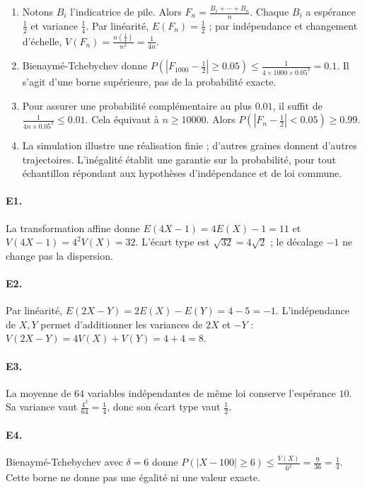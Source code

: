 \begin{enumerate}
\item Notons $B_i$ l'indicatrice de pile. Alors $F_n=\frac{B_1+\cdots+B_n}{n}$. Chaque $B_i$ a espérance $\frac{1}{2}$ et variance $\frac{1}{4}$. Par linéarité, $E(F_n)=\frac{1}{2}$ ; par indépendance et changement d'échelle, $V(F_n)=\frac{n(\frac{1}{4})}{n^2}=\frac{1}{4n}$.
\item Bienaymé-Tchebychev donne $P(|F_{1000}-\frac{1}{2}|\ge\num{0,05})\le\frac{1}{4\times1000\times\num{0,05}^2}=\num{0,1}$. Il s'agit d'une borne supérieure, pas de la probabilité exacte.
\item Pour assurer une probabilité complémentaire au plus $\num{0,01}$, il suffit de $\frac{1}{4n\times\num{0,05}^2}\le\num{0,01}$. Cela équivaut à $n\ge10000$. Alors $P(|F_n-\frac{1}{2}|<\num{0,05})\ge\num{0,99}$.
\item La simulation illustre une réalisation finie ; d'autres graines donnent d'autres trajectoires. L'inégalité établit une garantie sur la probabilité, pour tout échantillon répondant aux hypothèses d'indépendance et de loi commune.
\end{enumerate}

\paragraph{E1.}La transformation affine donne $E(4X-1)=4E(X)-1=11$ et $V(4X-1)=4^2V(X)=32$. L'écart type est $\sqrt{32}=4\sqrt2$ ; le décalage $-1$ ne change pas la dispersion.

\paragraph{E2.}Par linéarité, $E(2X-Y)=2E(X)-E(Y)=4-5=-1$. L'indépendance de $X,Y$ permet d'additionner les variances de $2X$ et $-Y$ : $V(2X-Y)=4V(X)+V(Y)=4+4=8$.

\paragraph{E3.}La moyenne de $64$ variables indépendantes de même loi conserve l'espérance $10$. Sa variance vaut $\frac{4^2}{64}=\frac{1}{4}$, donc son écart type vaut $\frac{1}{2}$.

\paragraph{E4.}Bienaymé-Tchebychev avec $\delta=6$ donne $P(|X-100|\ge6)\le \frac{V(X)}{6^2}=\frac{9}{36}=\frac{1}{4}$. Cette borne ne donne pas une égalité ni une valeur exacte.

